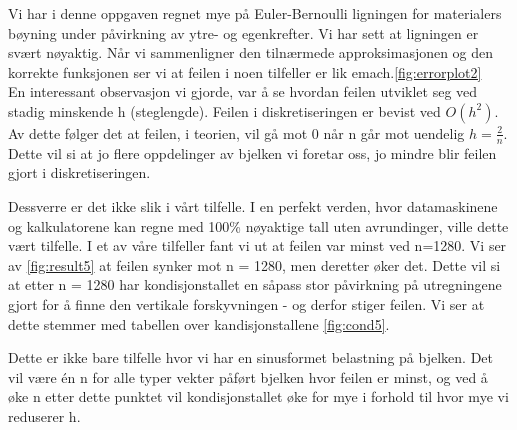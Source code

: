 Vi har i denne oppgaven regnet mye på Euler-Bernoulli ligningen for materialers bøyning under påvirkning av ytre- og egenkrefter. Vi har sett at ligningen er svært nøyaktig. Når vi sammenligner den tilnærmede approksimasjonen og den korrekte funksjonen ser vi at feilen i noen tilfeller er lik emach.\ref{fig:errorplot2}\\

En interessant observasjon vi gjorde, var å se hvordan feilen utviklet seg ved stadig minskende h (steglengde). Feilen i diskretiseringen er bevist ved $O(h^2)$. Av dette følger det at feilen, i teorien, vil gå mot 0 når n går mot uendelig $h=\frac{2}{n}$. Dette vil si at jo flere oppdelinger av bjelken vi foretar oss, jo mindre blir feilen gjort i diskretiseringen.

Dessverre er det ikke slik i vårt tilfelle. I en perfekt verden, hvor datamaskinene og kalkulatorene kan regne med 100\% nøyaktige tall uten avrundinger, ville dette vært tilfelle. I et av våre tilfeller fant vi ut at feilen var minst ved n=1280. Vi ser av \ref{fig:result5} at feilen synker mot n = 1280, men deretter øker det. Dette vil si at etter n = 1280 har kondisjonstallet en såpass stor påvirkning på utregningene gjort for å finne den vertikale forskyvningen - og derfor stiger feilen. Vi ser at dette stemmer med tabellen over kandisjonstallene \ref{fig:cond5}.

Dette er ikke bare tilfelle hvor vi har en sinusformet belastning på bjelken. Det vil være én n for alle typer vekter påført bjelken hvor feilen er minst, og ved å øke n etter dette punktet vil kondisjonstallet øke for mye i forhold til hvor mye vi reduserer h. 

